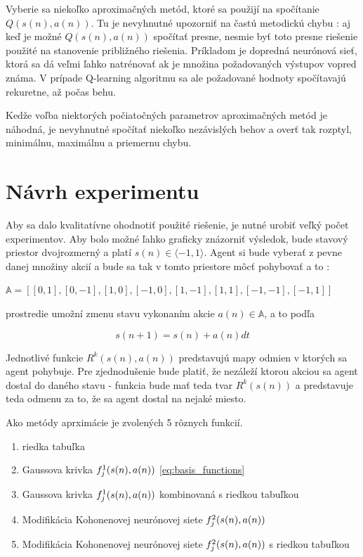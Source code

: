 Vyberie sa niekoľko aproximačných metód, ktoré sa použijí na spočítanie $Q(s(n), a(n))$.
Tu je nevyhnutné upozorniť na častú metodickú chybu : aj keď je možné $Q(s(n), a(n))$
spočítať presne, nesmie byť toto presne riešenie použité na stanovenie približného riešenia.
Príkladom je dopredná neurónová sieť, ktorá sa dá veľmi ľahko natrénovať ak je množina požadovaných
výstupov vopred známa. V prípade Q-learning algoritmu sa ale požadované hodnoty spočítavajú
rekuretne, až počas behu.

Kedže voľba niektorých počiatočných parametrov aproximačných metód je náhodná,
je nevyhnutné spočítať niekoľko nezávislých behov a overť tak rozptyl, minimálnu, maximálnu
a priemernu chybu.

\section {Návrh experimentu}

Aby sa dalo kvalitatívne ohodnotiť použité riešenie, je nutné urobiť veľký počet experimentov.
Aby bolo možné ľahko graficky znázorniť výsledok, bude stavový priestor dvojrozmerný a platí
$s(n) \in \langle -1, 1 \rangle$.
Agent si bude vyberať z pevne danej množiny akcií a bude sa tak v tomto priestore môcť pohybovať a to :

$\mathbb{A} = [ [0, 1], [0, -1], [1,  0], [-1, 0], [1, -1], [1, 1], [-1, -1], [-1, 1]] $

prostredie umožní zmenu stavu vykonaním akcie $a(n) \in \mathbb{A}$, a to podľa

\begin{equation}
s(n+1) = s(n) + a(n){dt}
\label{eq:q_learning}
\end{equation}

Jednotlivé funkcie $R^k(s(n), a(n))$ predstavujú mapy odmien v ktorých sa agent pohybuje. Pre zjednodušenie
bude platiť, že nezáleží ktorou akciou sa agent dostal do daného stavu - funkcia bude
mať teda tvar $R^k(s(n))$ a predstavuje teda odmenu za to, že sa agent dostal na nejaké miesto.

Ako metódy aprximácie je zvolených 5 rôznych funkcií.

\begin{enumerate}
\item riedka tabuľka
\item Gaussova krivka $f_j^1(\boldmath{s(n), a(n)})$ \ref{eq:basis_functions}
\item Gaussova krivka $f_j^1(\boldmath{s(n), a(n)})$ kombinovaná s riedkou tabuľkou
\item Modifikácia Kohonenovej neurónovej siete $f_j^2(\boldmath{s(n), a(n)})$
\item Modifikácia Kohonenovej neurónovej siete $f_j^2(\boldmath{s(n), a(n)})$ s riedkou tabuľkou
\end{enumerate}

